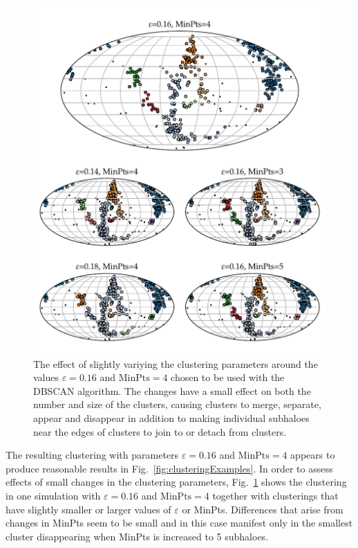 \documentclass[english, twoside]{HYgradu}
\begin{document}
\begin{figure}
    \centering
    \includegraphics{kuvat/smallClusteringVariations.pdf}
    \caption{The effect of slightly variying the clustering parameters around the values $\varepsilon=0.16$ and $\mathrm{MinPts}=4$ chosen to be used with the DBSCAN algorithm. The changes have a small effect on both the number and size of the clusters, causing clusters to merge, separate, appear and disappear in addition to making individual subhaloes near the edges of clusters to join to or detach from clusters.}\label{fig:clusteringvariations}
\end{figure}

The resulting clustering with parameters $\varepsilon=0.16$ and $\mathrm{MinPts}=4$ appears to produce reasonable results in Fig.~\ref{fig:clusteringExamples}. In order to assess effects of small changes in the clustering parameters, Fig.~\ref{fig:clusteringvariations} shows the clustering in one simulation with $\varepsilon=0.16$ and $\mathrm{MinPts}=4$ together with clusterings that have slightly smaller or larger values of $\varepsilon$ or MinPts. Differences that arise from changes in MinPts seem to be small and in this case manifest only in the smallest cluster disappearing when MinPts is increased to 5 subhaloes.
\end{document}

